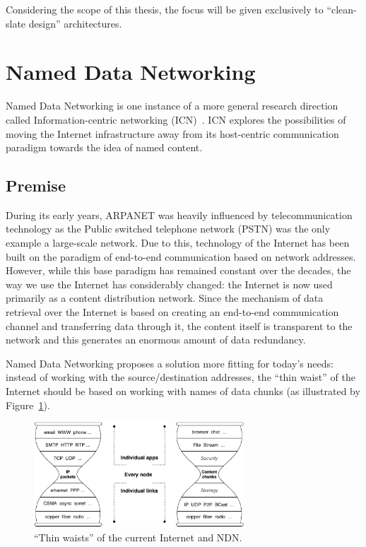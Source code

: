         Considering the scope of this thesis, the focus will be given exclusively to ``clean-slate design'' architectures.

    \section{Named Data Networking}\label{archs:ndn}

        Named Data Networking is one instance of a more general research direction called Information-centric networking (ICN)~\cite{icn}. ICN explores the possibilities of moving the Internet infrastructure away from its host-centric communication paradigm towards the idea of named content.

        \subsection{Premise}

            During its early years, ARPANET was heavily influenced by telecommunication technology as the Public switched telephone network (PSTN) was the only example a large-scale network. Due to this, technology of the Internet has been built on the paradigm of end-to-end communication based on network addresses. However, while this base paradigm has remained constant over the decades, the way we use the Internet has considerably changed: the Internet is now used primarily as a content distribution network. Since the mechanism of data retrieval over the Internet is based on creating an end-to-end communication channel and transferring data through it, the content itself is transparent to the network and this generates an enormous amount of data redundancy.

            Named Data Networking proposes a solution more fitting for today's needs: instead of working with the source/destination addresses, the ``thin waist'' of the Internet should be based on working with names of data chunks (as illustrated by Figure~\ref{fig:ndn_waist}).

            \begin{figure}[H]
                \begin{center}
                    \includegraphics[width=0.7\textwidth]{fig/archs_ndn-hourglass.pdf}
                  \caption{``Thin waists'' of the current Internet and NDN.}
                  \label{fig:ndn_waist}
                \end{center}
            \end{figure}

